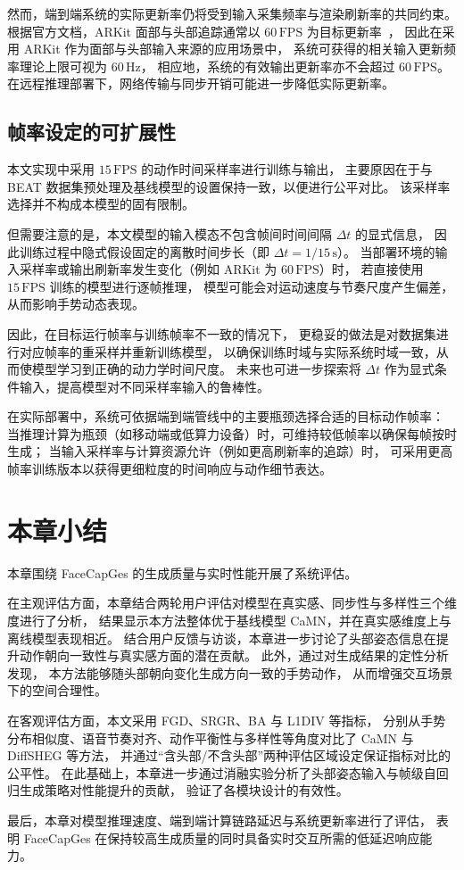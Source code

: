 然而，端到端系统的实际更新率仍将受到输入采集频率与渲染刷新率的共同约束。
根据官方文档，ARKit 面部与头部追踪通常以 $60\,\mathrm{FPS}$ 为目标更新率~\cite{AppleARKitTrackingGuide}，
因此在采用 ARKit 作为面部与头部输入来源的应用场景中，
系统可获得的相关输入更新频率理论上限可视为 $60\,\mathrm{Hz}$，
相应地，系统的有效输出更新率亦不会超过 $60\,\mathrm{FPS}$。
在远程推理部署下，网络传输与同步开销可能进一步降低实际更新率。

\subsection{帧率设定的可扩展性}
本文实现中采用 $15\,\mathrm{FPS}$ 的动作时间采样率进行训练与输出，
主要原因在于与 BEAT 数据集预处理及基线模型的设置保持一致，以便进行公平对比。
该采样率选择并不构成本模型的固有限制。

但需要注意的是，本文模型的输入模态不包含帧间时间间隔 $\Delta t$ 的显式信息，
因此训练过程中隐式假设固定的离散时间步长（即 $\Delta t = 1/15\,\mathrm{s}$）。
当部署环境的输入采样率或输出刷新率发生变化（例如 ARKit 为 $60\,\mathrm{FPS}$）时，
若直接使用 $15\,\mathrm{FPS}$ 训练的模型进行逐帧推理，
模型可能会对运动速度与节奏尺度产生偏差，从而影响手势动态表现。

因此，在目标运行帧率与训练帧率不一致的情况下，
更稳妥的做法是对数据集进行对应帧率的重采样并重新训练模型，
以确保训练时域与实际系统时域一致，从而使模型学习到正确的动力学时间尺度。
未来也可进一步探索将 $\Delta t$ 作为显式条件输入，提高模型对不同采样率输入的鲁棒性。

在实际部署中，系统可依据端到端管线中的主要瓶颈选择合适的目标动作帧率：
当推理计算为瓶颈（如移动端或低算力设备）时，可维持较低帧率以确保每帧按时生成；
当输入采样率与计算资源允许（例如更高刷新率的追踪）时，
可采用更高帧率训练版本以获得更细粒度的时间响应与动作细节表达。

\section{本章小结}

本章围绕 FaceCapGes 的生成质量与实时性能开展了系统评估。

在主观评估方面，本章结合两轮用户评估对模型在真实感、同步性与多样性三个维度进行了分析，
结果显示本方法整体优于基线模型 CaMN，并在真实感维度上与离线模型表现相近。
结合用户反馈与访谈，本章进一步讨论了头部姿态信息在提升动作朝向一致性与真实感方面的潜在贡献。
此外，通过对生成结果的定性分析发现，
本方法能够随头部朝向变化生成方向一致的手势动作，
从而增强交互场景下的空间合理性。

在客观评估方面，本文采用 FGD、SRGR、BA 与 L1DIV 等指标，
分别从手势分布相似度、语音节奏对齐、动作平衡性与多样性等角度对比了 CaMN 与 DiffSHEG 等方法，
并通过“含头部/不含头部”两种评估区域设定保证指标对比的公平性。
在此基础上，本章进一步通过消融实验分析了头部姿态输入与帧级自回归生成策略对性能提升的贡献，
验证了各模块设计的有效性。

最后，本章对模型推理速度、端到端计算链路延迟与系统更新率进行了评估，
表明 FaceCapGes 在保持较高生成质量的同时具备实时交互所需的低延迟响应能力。
